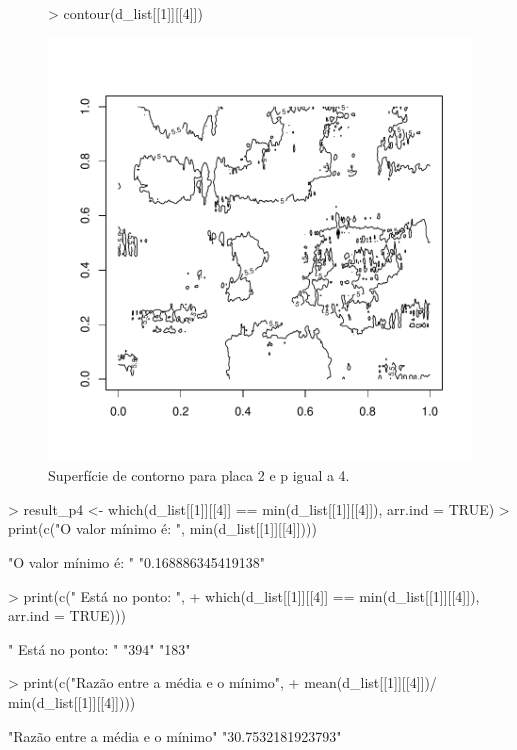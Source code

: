 \documentclass[12pt]{article}
\begin{document}
\begin{figure}
\centering
\begin{Schunk}
\begin{Sinput}
> contour(d_list[[1]][[4]])
\end{Sinput}
\end{Schunk}
\includegraphics{template_matching-026}
\caption{Superfície de contorno para placa 2 e p igual a 4.}
\label{placa2p4}
\end{figure}
\begin{Schunk}
\begin{Sinput}
> result_p4 <- which(d_list[[1]][[4]] == min(d_list[[1]][[4]]), arr.ind = TRUE)
> print(c("O valor mínimo é: ",  min(d_list[[1]][[4]])))
\end{Sinput}
\begin{Soutput}
[1] "O valor mínimo é: " "0.168886345419138" 
\end{Soutput}
\begin{Sinput}
> print(c(" Está no ponto: ",
+         which(d_list[[1]][[4]] == min(d_list[[1]][[4]]), arr.ind = TRUE)))
\end{Sinput}
\begin{Soutput}
[1] " Está no ponto: " "394"              "183"             
\end{Soutput}
\begin{Sinput}
> print(c("Razão entre a média e o mínimo", 
+         mean(d_list[[1]][[4]])/ min(d_list[[1]][[4]])))
\end{Sinput}
\begin{Soutput}
[1] "Razão entre a média e o mínimo" "30.7532181923793"              
\end{Soutput}
\end{Schunk}
\end{document}
